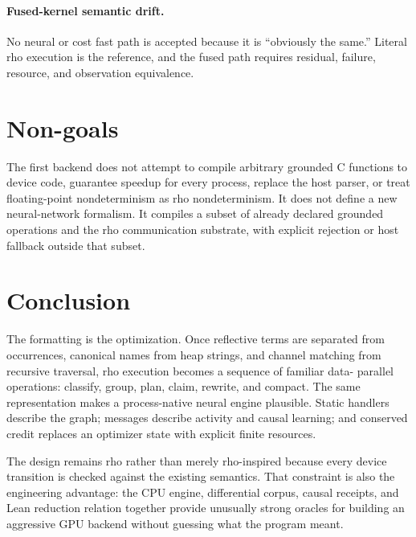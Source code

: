 \documentclass[11pt]{article}
\begin{document}
\paragraph{Fused-kernel semantic drift.}
No neural or cost fast path is accepted because it is ``obviously the same.''
Literal rho execution is the reference, and the fused path requires residual,
failure, resource, and observation equivalence.

\section{Non-goals}

The first backend does not attempt to compile arbitrary grounded C functions
to device code, guarantee speedup for every process, replace the host parser,
or treat floating-point nondeterminism as rho nondeterminism.  It does not
define a new neural-network formalism.  It compiles a subset of already
declared grounded operations and the rho communication substrate, with
explicit rejection or host fallback outside that subset.

\section{Conclusion}

The formatting is the optimization.  Once reflective terms are separated
from occurrences, canonical names from heap strings, and channel matching
from recursive traversal, rho execution becomes a sequence of familiar data-
parallel operations: classify, group, plan, claim, rewrite, and compact.  The
same representation makes a process-native neural engine plausible.  Static
handlers describe the graph; messages describe activity and causal learning;
and conserved credit replaces an optimizer state with explicit finite
resources.

The design remains rho rather than merely rho-inspired because every device
transition is checked against the existing semantics.  That constraint is
also the engineering advantage: the CPU engine, differential corpus, causal
receipts, and Lean reduction relation together provide unusually strong
oracles for building an aggressive GPU backend without guessing what the
program meant.
\end{document}

